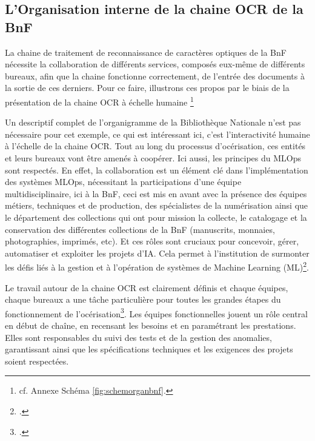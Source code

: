 \documentclass[a4paper,12pt,twoside]{book}
\begin{document}
	\subsection{L’Organisation interne de la chaine OCR de la BnF}
	
	La chaine de traitement de reconnaissance de caractères optiques de la BnF nécessite la collaboration de différents services, composés eux-même de différents bureaux, afin que la chaine fonctionne correctement, de l’entrée des documents à la sortie de ces derniers. Pour ce faire, illustrons ces propos par le biais de la présentation de la chaine OCR à échelle humaine \footnote{cf. Annexe Schéma \ref{fig:schemorganbnf}.} 
	
	Un descriptif complet de l’organigramme de la Bibliothèque Nationale n’est pas nécessaire pour cet exemple, ce qui est intéressant ici, c’est l’interactivité humaine à l’échelle de la chaine OCR. Tout au long du processus d’océrisation, ces entités et leurs bureaux vont être amenés à coopérer. Ici aussi, les principes du MLOps sont respectés. 
	En effet, la collaboration est un élément clé dans l’implémentation des systèmes MLOps, nécessitant la participations d’une équipe multidisciplinaire, ici à la BnF, ceci est mis en avant avec la présence des équipes métiers, techniques et de production, des spécialistes de la numérisation ainsi que le département des collections qui ont pour mission la collecte, le catalogage et la conservation des différentes collections de la BnF (manuscrits, monnaies, photographies, imprimés, etc). Et ces rôles sont cruciaux pour concevoir, gérer, automatiser et exploiter les projets d’IA. Cela permet à l’institution de surmonter les défis liés à la gestion et à l’opération de systèmes de Machine Learning (ML)\footcite{kreuzberger_mlops_2023}. 
	
	Le travail autour de la chaine OCR est clairement définis et chaque équipes, chaque bureaux a une tâche particulière pour toutes les grandes étapes du fonctionnement de l’océrisation\footcite{bnf_printemps_2024}. Les équipes fonctionnelles jouent un rôle central en début de chaîne, en recensant les besoins et en paramétrant les prestations. Elles sont responsables du suivi des tests et de la gestion des anomalies, garantissant ainsi que les spécifications techniques et les exigences des projets soient respectées.
	
\end{document}
